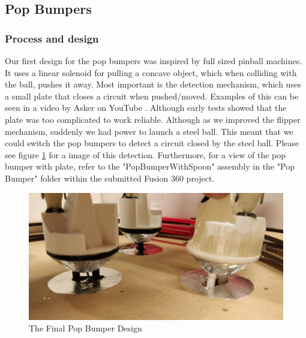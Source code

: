 \subsection{Pop Bumpers}
\subsubsection{Process and design}
Our first design for the pop bumpers was inspired by full sized pinball machines. It uses a linear solenoid for pulling a concave object, which when colliding with the ball, pushes it away. Most important is the detection mechanism, which uses a small plate that closes a circuit when pushed/moved. Examples of this can be seen in a video by Asker on YouTube \cite{asker_2017}. Although early tests showed that the plate was too complicated to work reliable.
Although as we improved the flipper mechanism, suddenly we had power to launch a steel ball. This meant that we could switch the pop bumpers to detect a circuit closed by the steel ball. Please see figure \ref{fig:newpop} for a image of this detection. Furthermore, for a view of the pop bumper with plate, refer to the "PopBumperWithSpoon" assembly in the "Pop Bumper" folder within the submitted Fusion 360 project.
\begin{figure}[H]
	\centering
	\includegraphics[scale=0.15]{img/new_bumper_design}
	\caption{The Final Pop Bumper Design}
	\label{fig:newpop}
\end{figure}

